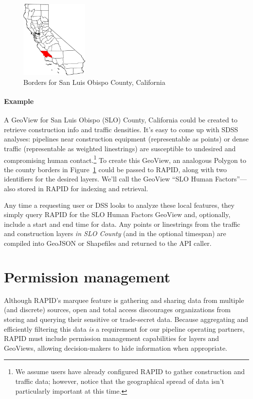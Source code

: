 \begin{figure}
    \centering

    \includegraphics[width=0.3\textwidth]{figures/slo_county.png}
    
    \caption{Borders for San Luis Obispo County, California}
    \label{fig:county}
    
\end{figure}

\paragraph{Example}
A GeoView for San Luis Obispo (SLO) County, California could be created to retrieve construction info and traffic densities. It's easy to come up with SDSS analyses: pipelines near construction equipment (representable as points) or dense traffic (representable as weighted linestrings) are susceptible to undesired and compromising human contact.\footnote{We assume users have already configured RAPID to gather construction and traffic data; however, notice that the geographical spread of data isn't particularly important at this time.} To create this GeoView, an analogous Polygon to the county borders in Figure~\ref{fig:county} could be passed to RAPID, along with two identifiers for the desired layers. We'll call the GeoView ``SLO Human Factors''---also stored in RAPID for indexing and retrieval.

Any time a requesting user or DSS looks to analyze these local features, they simply query RAPID for the SLO Human Factors GeoView and, optionally, include a start and end time for data. Any points or linestrings from the traffic and construction layers \textit{in SLO County} (and in the optional timespan) are compiled into GeoJSON or Shapefiles and returned to the API caller.

\section{Permission management}
Although RAPID's marquee feature is gathering and sharing data from multiple (and discrete) sources, open and total access discourages organizations from storing and querying their sensitive or trade-secret data. Because aggregating and efficiently filtering this data \textit{is} a requirement for our pipeline operating partners, RAPID must include permission management capabilities for layers and GeoViews, allowing decision-makers to hide information when appropriate.

